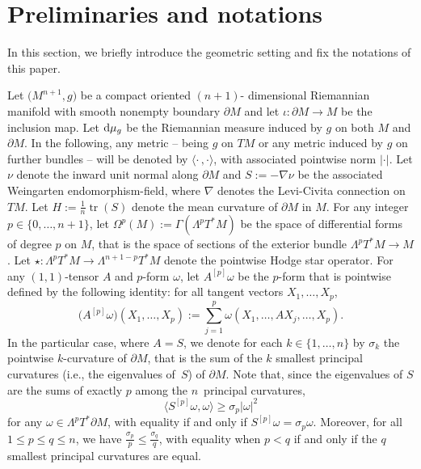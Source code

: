 \section{Preliminaries and notations}\label{s:prelim}

In this section, we briefly introduce the geometric setting and fix the notations of this paper.

Let $\big(M^{n+1},g\big)$ be a compact oriented $(n+1)$- dimensional Riemannian ma\-ni\-fold with smooth nonempty boundary $\partial M$ and let $\iota\colon\partial M\to M$ be the inclusion map.
Let ${\rm d}\mu_g$ be the Riemannian measure induced by $g$ on both $M$ and $\partial M$.
In the following, any metric -- being $g$ on $TM$ or any metric induced by $g$ on further bundles -- will be denoted by $\langle\cdot\,,\cdot\rangle$, with associated pointwise norm $|\cdot|$.
Let $\nu$ denote the inward unit normal along $\partial M$ and $S:=-\nabla\nu$ be the associated Weingarten endomorphism-field, where $\nabla$ denotes the Levi-Civita connection on $TM$.
Let $H:=\frac{1}{n}\operatorname{tr}(S)$ denote the mean curvature of $\partial M$ in $M$.
For any integer $p\in\{0,\dots,n+1\}$, let $\Omega^p(M):=\Gamma(\Lambda^pT^*M)$ be the space of differential forms of degree $p$ on $M$, that is the space of sections of the exterior bundle $\Lambda^p T^*M\to M$.
Let $\star\colon\Lambda^pT^*M\to\Lambda^{n+1-p}T^*M$ denote the pointwise Hodge star  operator.
For any $(1,1)$-tensor $A$ and $p$-form $\omega$, let $A^{[p]}\omega$ be the $p$-form that is pointwise defined by the following identity: for all tangent vectors $X_1,\dots,X_p$,
\[\bigl(A^{[p]}\omega\bigr)(X_1,\dots,X_p):=\sum_{j=1}^p\omega(X_1,\dots,AX_j,\dots,X_p).\]
In the particular case, where $A=S$, we denote for each $k\in\{1,\dots,n\}$ by $\sigma_k$ the pointwise $k$-curvature of $\partial M$, that is the sum of the $k$ smallest principal curvatures (i.e., the eigenvalues of~$S$) of $\partial M$.
Note that, since the eigenvalues of $S$ are the sums of exactly $p$ among the $n$~principal curvatures,
\[\bigl\langle S^{[p]}\omega,\omega\bigr\rangle\geq\sigma_p|\omega|^2\]
for any $\omega\in\Lambda^pT^*\partial M$, with equality if and only if $S^{[p]}\omega=\sigma_p\omega$.
Moreover, for all $1\leq p\leq q\leq n$, we have $\frac{\sigma_p}{p}\leq\frac{\sigma_q}{q}$, with equality when $p<q$ if and only if the $q$ smallest principal curvatures are equal.

